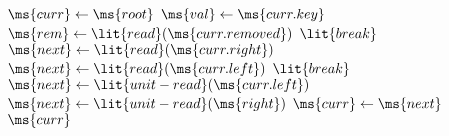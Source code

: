 \begin{algorithm*}[!ht]
\begin{algorithmic}[1]
\begin{multicols}{2}
{{			%
			\State $\ms{curr} \gets \ms{root}$
				\State $\ms{val} \gets \ms{curr.key}$ 
				\State $\ms{rem} \gets \lit{read}(\ms{curr.removed})$
				 $\lit{break}$ \label{line:eq-find}  
				 $\ms{next} \gets \lit{read}(\ms{curr.right})$ \label{line:next-find1} 
				\Else{} $\ms{next} \gets \lit{read}(\ms{curr.left})$ \label{line:next-find2}
				\EndIf
					 $\lit{break}$
					 $\ms{next} \gets \lit{unit-read}(\ms{curr.left})$
					\Else $\ms{next} \gets \lit{unit-read}(\ms{right})$ \label{line:rem-find2}
					\EndIf
				\EndIf
				\State $\ms{curr} \gets \ms{next}$
			\EndWhile
			\Return $\ms{curr}$ \EndReturn

		}\EndPart

		\Statex
   	
		\EndPart

				
		\Statex
		
}
\end{multicols}
\end{algorithmic}
\end{algorithm*}
